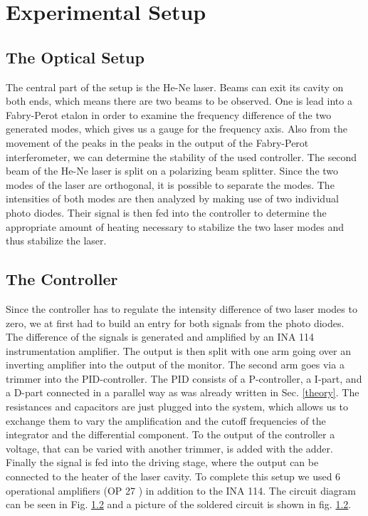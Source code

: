 \documentclass[a4paper,10pt]{article}
\begin{document}
\section{Experimental Setup}
\subsection{The Optical Setup}
The central part of the setup is the He-Ne laser. Beams can exit its cavity on both ends, which means there are two beams to be observed. One is lead into a Fabry-Perot etalon in order to examine the frequency difference of the two generated modes, which gives us a gauge for the frequency axis. Also from the movement of the peaks in the peaks in the output of the Fabry-Perot interferometer, we can determine the stability of the used controller.
\newline
The second beam of the He-Ne laser is split on a polarizing beam splitter. Since the two modes of the laser are orthogonal, it is possible to separate the modes. The intensities of both modes are then analyzed by making use of two individual photo diodes. Their signal is then fed into the controller to determine the appropriate amount of heating necessary to stabilize the two laser modes and thus stabilize the laser.
\subsection{The Controller}
Since the controller has to regulate the intensity difference of two laser modes to zero, we at first had to build an entry for both signals from the photo diodes. The difference of the signals is generated and amplified by an INA 114 \cite{ina114} instrumentation amplifier. The output is then split with one arm going over an inverting amplifier into the output of the monitor. The second arm goes via a trimmer into the PID-controller.
\newline
The PID consists of a P-controller, a I-part, and a D-part connected in a parallel way as was already written in Sec. \ref{theory}. The resistances and capacitors are just plugged into the system, which allows us to exchange them to vary the amplification and the cutoff frequencies of the integrator and the differential component. To the output of the controller a  voltage, that can be varied with another trimmer, is added with the adder. Finally the signal is fed into the driving stage, where the output can be connected to the heater of the laser cavity. To complete this setup we used 6 operational amplifiers (OP 27 \cite{op27}) in addition to the INA 114. The circuit diagram can be seen in Fig. \ref{} and a picture of the soldered circuit is shown in fig. \ref{}.
\end{document}
